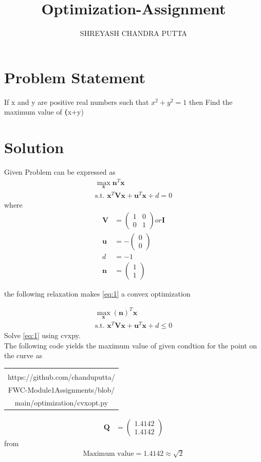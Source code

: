 \documentclass[journal,10pt,twocolumn]{article}
\title{
Optimization-Assignment
}
\author{SHREYASH CHANDRA PUTTA}
\newcommand{\myvec}[1]{\ensuremath{\begin{pmatrix}#1\end{pmatrix}}}
\let\vec\mathbf
\let\vec\mathbf
\providecommand{\brak}[1]{\ensuremath{\left(#1\right)}}
\begin{document}
\maketitle
\tableofcontents
\bigskip
\section{Problem Statement}
If x and y are positive real numbers such that $x^2 +y^2 = 1$ then Find the maximum value of \textbf(x+y)

\section{Solution}

Given Problem can be expressed as 
\begin{align}
\label{eq:1}
\max_{\vec{x}}{\vec{n}}^T{\vec{x}}\\
\label{eq:2}
\text {s.t. }\vec{x}^T\vec{V}\vec{x} + \vec{u}^T\vec{x}  +d = 0
\end{align}
%
where
%
\begin{align}
\vec{V} &= \myvec{1 & 0\\0 & 1} or \vec{I}
\\
\vec{u} &= -\myvec{0 \\ 0}
\\
d &= -1
\\
\vec{n} &= \myvec{1 \\ 1}
\end{align}

the following relaxation makes
\eqref{eq:1} a convex optimization 

\begin{align}
\label{eq:7}
\max_{\vec{x}}\brak{\vec{n}}^T{\vec{x}}\\
\text{s.t. }\vec{x}^T\vec{V}\vec{x} + \vec{u}^T\vec{x} + d \le 0
\end{align}
Solve \eqref{eq:1} using cvxpy.
\\
The following code yields the maximum value of given condtion for the point on the curve as
%
{\setlength\extrarowheight{0pt}
\begin{table}[h]
    \centering
    \begin{tabular}{|c|}
    \hline \\
         https://github.com/chanduputta/\\FWC-Module1Assignments/blob/\\main/optimization/cvxopt.py  \\       
\hline
    \end{tabular}
\end{table}}
%
\begin{align}
\vec{Q} &= \myvec{1.4142\\1.4142}
\end{align}
from 
\begin{align}
\boxed{\text{Maximum value} = 1.4142 \approx \sqrt{2}} 
\end{align}
\end{document}
